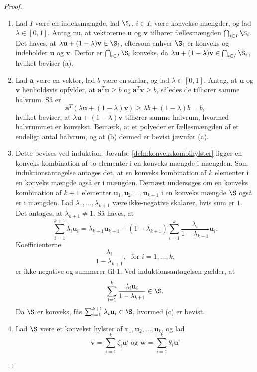 \begin{proof}
\begin{enumerate}[label=(\alph*)]
\item Lad $I$ være en indeksmængde, lad $\S_i$, $i \in I$, være konvekse mængder, og lad $ \lambda \in [0,1]$.
Antag nu, at vektorerne $\textbf{u}$ og $\textbf{v}$ tilhører fællesmængden $ \bigcap_{i \in I} \S_i$. 
Det haves, at $ \lambda \textbf{u} + (1 - \lambda )\textbf{v} \in \S_i$, eftersom enhver $\S_i$ er konveks og  indeholder $\textbf{u}$ og $\textbf{v}$. Derfor er $ \bigcap_{i \in I} \S_i$ konveks, da $ \lambda \textbf{u} + (1 - \lambda )\textbf{v} \in  \bigcap_{i \in I} \S_i$, hvilket beviser (a).
%
\item Lad $\textbf{a}$ være en vektor, lad $b$ være en skalar, og lad $ \lambda \in [0,1]$. 
Antag, at $\textbf{u}$ og $\textbf{v}$ henholdsvis opfylder, at $\textbf{a}^T \textbf{u} \geq b$ og $\textbf{a}^T \textbf{v} \geq b$, således de tilhører samme halvrum. 
Så er $$\textbf{a}^T (\lambda \textbf{u} + (1 - \lambda) \textbf{v} ) \geq \lambda b + (1 - \lambda ) b = b,$$ hvilket beviser, at $ \lambda \textbf{u} + (1 - \lambda )\textbf{v}$ tilhører samme halvrum, hvormed halvrummet er konvekst.
Bemærk, at et polyeder er fællesmængden af et endeligt antal halvrum, og at (b) dermed er bevist jævnfør (a).
%
\item  Dette bevises ved induktion.
Jævnfør \ref{defn:konvekskombihylster} ligger en konveks kombination af to elementer i en konveks mængde i mængden.
Som induktionsantagelse antages det, at en konveks kombination af $k$ elementer i en konveks mængde også er i mængden.
Dernæst undersøges om en konveks kombination af $k+1$ elementer $\textbf{u}_1,\textbf{u}_2,\ldots,\textbf{u}_{k+1}$ i en konveks mængde $\S$ også er i mængden.
Lad $\lambda_1,\ldots,\lambda_{k+1}$ være ikke-negative skalarer, hvis sum er $1$. 
Det antages, at $\lambda_{k+1}\neq1$. 
Så haves, at
%
$$\sum^{k+1}_{i=1}\lambda_i\textbf{u}_i=\lambda_{k+1}\textbf{u}_{k+1}+(1-\lambda_{k+1})\sum^{k}_{i=1}\dfrac{\lambda_i}{1-\lambda_{k+1}}\textbf{u}_i.$$
%
Koefficienterne 
%
$$\frac{\lambda_i}{1-\lambda_{k+1}}, \phantom{i} \text{ for } i=1,\ldots,k,$$
%
er ikke-negative og summerer til $1$. 
Ved induktionsantagelsen gælder, at
%
$$\sum^{k}_{i=1}\frac{\lambda_i\textbf{u}_i}{1-\lambda_{k+1}}\in \S.$$
%
Da $\S$ er konveks, fås 
$\sum^{k+1}_{i=1}\lambda_i\textbf{u}_i\in \S$, hvormed (c) er bevist. 
%
\item Lad $\S$ være et konvekst hylster af $\textbf{u}_1, \textbf{u}_2, \ldots, \textbf{u}_k$, og lad
%
$$\textbf{v} = \sum_{i=1}^{k} \zeta_i \textbf{u}^i \text{ og } \textbf{w} = \sum_{i=1}^{k} \theta_i \textbf{u}^i$$

\end{enumerate}
\end{proof}
